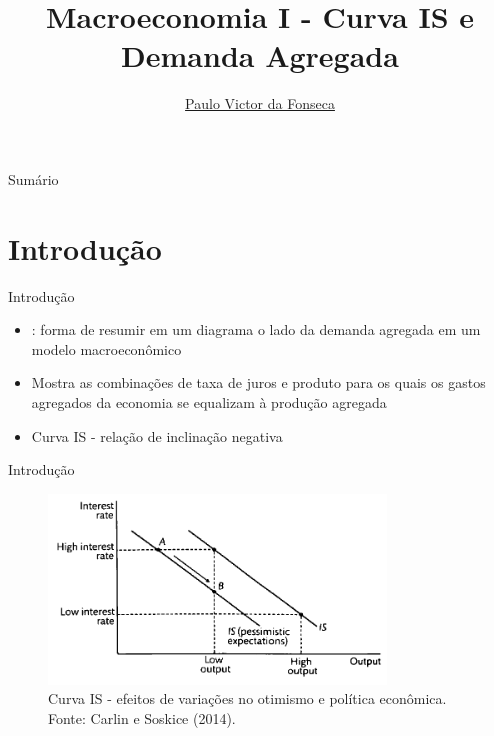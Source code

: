 \documentclass[10pt]{beamer}
\title[]{Macroeconomia I - Curva IS e Demanda Agregada}
\author[]{\href{https://pvfonseca.github.io}{Paulo Victor da Fonseca}}
\date{}
\begin{document}
\begin{frame}[plain]
\end{frame}

\begin{frame}{Sumário}
    \tableofcontents
\end{frame}

\section{Introdução}
\begin{frame}{Introdução}
    \begin{itemize}
        \item {}: forma de resumir em um diagrama o lado da demanda agregada em um modelo macroeconômico\bigskip

        \item Mostra as combinações de taxa de juros e produto para os quais os gastos agregados da economia se equalizam à produção agregada\bigskip

        \item Curva IS - relação de inclinação negativa
    \end{itemize}
\end{frame}

\begin{frame}{Introdução}    
    \begin{figure}
        \centering
        \includegraphics[width=0.8\textwidth]{./figures/aula6_fig1.PNG}
        \caption{Curva IS - efeitos de variações no otimismo e política econômica. Fonte: Carlin e Soskice (2014).}
        \label{aula6_fig1}
    \end{figure}
\end{frame}
\end{document}
